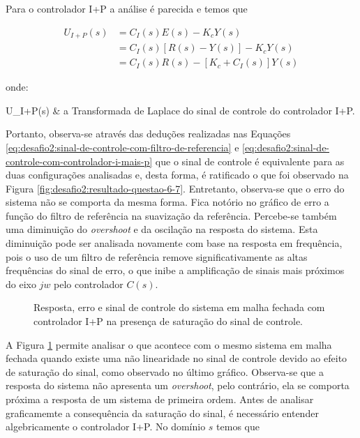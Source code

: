 Para o controlador I+P a análise é parecida e temos que

\begin{equation}
    \label{eq:desafio2:sinal-de-controle-com-controlador-i-mais-p}
    \begin{split}
        U_{I+P}(s) &= C_{I}(s)E(s) - K_{c}Y(s) \\
                   &= C_{I}(s)[R(s) - Y(s)] - K_{c}Y(s) \\
                   &= C_{I}(s)R(s) - [K_{c} + C_{I}(s)]Y(s)
    \end{split}
\end{equation}

onde:

\begin{conditions*}
    U_{I+P}(s) & a Transformada de Laplace do sinal de controle do controlador I+P.
\end{conditions*}

Portanto, observa-se através das deduções realizadas nas Equações
\ref{eq:desafio2:sinal-de-controle-com-filtro-de-referencia} e
\ref{eq:desafio2:sinal-de-controle-com-controlador-i-mais-p} que o sinal de
controle é equivalente para as duas configurações analisadas e, desta forma, é
ratificado o que foi observado na Figura
\ref{fig:desafio2:resultado-questao-6-7}. Entretanto, observa-se que o erro do
sistema não se comporta da mesma forma. Fica notório no gráfico de erro a função
do filtro de referência na suavização da referência. Percebe-se também uma
diminuição do \textit{overshoot} e da oscilação na resposta do sistema. Esta
diminuição pode ser analisada novamente com base na resposta em frequência, pois
o uso de um filtro de referência remove significativamente as altas frequências
do sinal de erro, o que inibe a amplificação de sinais mais próximos do eixo
$jw$ pelo controlador $C(s)$.

\begin{figure}[!ht]
    \caption{Resposta, erro e sinal de controle do sistema em malha fechada com
    controlador I+P na presença de saturação do sinal de controle.}
    \vspace{-10pt}
    \hspace{-30pt}
    \label{fig:desafio2:resultado-questao-8}
    \begin{minipage}{\linewidth}
        
    \end{minipage}
\end{figure}

A Figura \ref{fig:desafio2:resultado-questao-8} permite analisar o que acontece
com o mesmo sistema em malha fechada quando existe uma não linearidade no sinal
de controle devido ao efeito de saturação do sinal, como observado no último
gráfico. Observa-se que a resposta do sistema não apresenta um
\textit{overshoot}, pelo contrário, ela se comporta próxima a resposta de um
sistema de primeira ordem. Antes de analisar graficamemte a consequência da
saturação do sinal, é necessário entender algebricamente o controlador I+P. No
domínio $s$ temos que 

